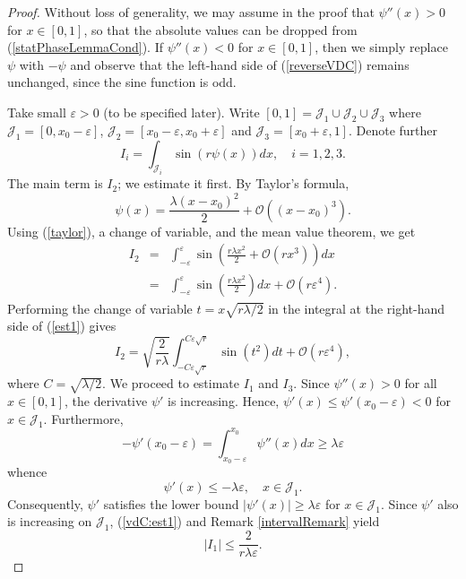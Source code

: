 \documentclass{amsart}
\numberwithin{equation}{section}
\begin{document}
\begin{proof}
Without loss of generality, we may assume in the proof that $\psi''(x)>0$ for $x\in[0,1]$, so that the absolute values can be dropped from (\ref{statPhaseLemmaCond}). If $\psi''(x)<0$ for $x\in[0,1]$, then we simply replace $\psi$ with $-\psi$ and observe that the left-hand side of (\ref{reverseVDC}) remains unchanged, since the sine function is odd. 

Take small $\varepsilon>0$ (to be specified later). Write $[0,1]=\mathcal{J}_1\cup\mathcal{J}_2\cup\mathcal{J}_3$ where $\mathcal{J}_1=[0,x_0-\varepsilon]$, $\mathcal{J}_2=[x_0-\varepsilon,x_0+\varepsilon]$ and $\mathcal{J}_3=[x_0+\varepsilon,1]$. Denote further
$$
I_i=\int_{\mathcal{J}_i}\sin(r\psi(x))dx,\quad i=1,2,3.
$$
The main term is $I_2$; we estimate it first.
By Taylor's formula,
\begin{equation}
    \label{taylor}
    \psi(x)=\frac{\lambda (x-x_0)^2}{2}+\mathcal{O}((x-x_0)^3).
\end{equation}
Using (\ref{taylor}), a change of variable, and the mean value theorem, we get
\begin{eqnarray}
    \nonumber
    I_2&=&\int_{-\varepsilon}^\varepsilon\sin\left(\frac{r\lambda x^2}{2}+\mathcal{O}(rx^3)\right)dx\\
    \label{est1}
    &=&\int_{-\varepsilon}^\varepsilon\sin\left(\frac{r\lambda x^2}{2}\right)dx+\mathcal{O}(r\varepsilon^4).
\end{eqnarray}
Performing the change of variable $t=x\sqrt{r\lambda/2}$ in the integral at the right-hand side of (\ref{est1}) gives
\begin{equation}
    \label{I1estim}
I_2=\sqrt{\frac{2}{r\lambda}}\int_{-C\varepsilon\sqrt{r}}^{C\varepsilon\sqrt{r}}\sin(t^2)dt+\mathcal{O}(r\varepsilon^4),
\end{equation}
where $C=\sqrt{\lambda/2}$. We proceed to estimate $I_1$ and $I_3$. Since $\psi''(x)>0$ for all $x\in[0,1]$, the derivative $\psi'$ is increasing. Hence, $\psi'(x)\le\psi'(x_0-\varepsilon)<0$ for $x\in\mathcal{J}_1$. Furthermore,
$$
-\psi'(x_0-\varepsilon)=\int_{x_0-\varepsilon}^{x_0}\psi''(x)dx\ge\lambda\varepsilon
$$
whence
$$
\psi'(x)\le-\lambda\varepsilon,\quad x\in\mathcal{J}_1.
$$
Consequently, $\psi'$ satisfies the lower bound $|\psi'(x)|\ge\lambda\varepsilon$ for $x\in\mathcal{J}_1$. Since $\psi'$ also is increasing on $\mathcal{J}_1$, (\ref{vdC:est1}) and Remark \ref{intervalRemark} yield
\begin{equation}
    \label{I2estim}
    |I_1|\le \frac{2}{r\lambda\varepsilon}.

\end{equation}
\end{proof}
\end{document}
